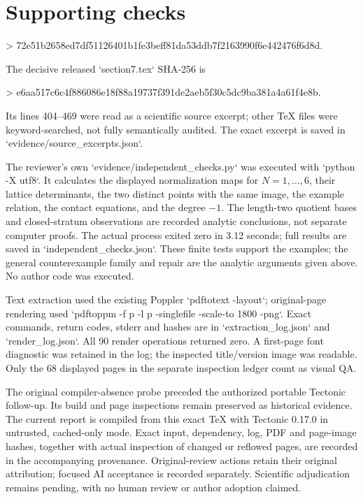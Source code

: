 \documentclass[10pt]{article}
\begin{document}
\section*{Supporting checks}
> 72e51b2658ed7df51126401b1fe3beff81da53ddb7f2163990f6e442476f6d8d.\par
The decisive released `section7.tex` SHA-256 is\par
> e6aa517c6c4f886086e18f88a19737f391de2aeb5f30c5dc9ba381a4a61f4e8b.\par
Its lines 404–469 were read as a scientific source excerpt; other TeX files were keyword-searched, not fully semantically audited. The exact excerpt is saved in `evidence/source\_excerpts.json`.\par
The reviewer’s own `evidence/independent\_checks.py` was executed with `python -X utf8`. It calculates the displayed normalization maps for \(N=1,\ldots,6\), their lattice determinants, the two distinct points with the same image, the example relation, the contact equations, and the degree \(-1\). The length-two quotient bases and closed-stratum observations are recorded analytic conclusions, not separate computer proofs. The actual process exited zero in 3.12 seconds; full results are saved in `independent\_checks.json`. These finite tests support the examples; the general counterexample family and repair are the analytic arguments given above. No author code was executed.\par
Text extraction used the existing Poppler `pdftotext -layout`; original-page rendering used `pdftoppm -f p -l p -singlefile -scale-to 1800 -png`. Exact commands, return codes, stderr and hashes are in `extraction\_log.json` and `render\_log.json`. All 90 render operations returned zero. A first-page font diagnostic was retained in the log; the inspected title/version image was readable. Only the 68 displayed pages in the separate inspection ledger count as visual QA.\par
The original compiler-absence probe preceded the authorized portable Tectonic follow-up. Its build and page inspections remain preserved as historical evidence. The current report is compiled from this exact TeX with Tectonic 0.17.0 in untrusted, cached-only mode. Exact input, dependency, log, PDF and page-image hashes, together with actual inspection of changed or reflowed pages, are recorded in the accompanying provenance. Original-review actions retain their original attribution; focused AI acceptance is recorded separately. Scientific adjudication remains pending, with no human review or author adoption claimed.\par
\end{document}
